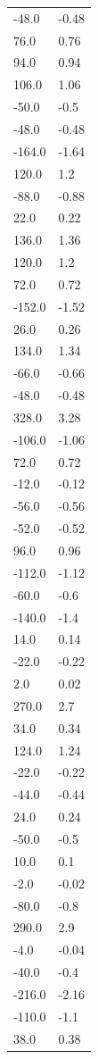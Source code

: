 \begin{longtable}{ll}
-48.0 & -0.48 \\
76.0 & 0.76 \\
94.0 & 0.94 \\
106.0 & 1.06 \\
-50.0 & -0.5 \\
-48.0 & -0.48 \\
-164.0 & -1.64 \\
120.0 & 1.2 \\
-88.0 & -0.88 \\
22.0 & 0.22 \\
136.0 & 1.36 \\
120.0 & 1.2 \\
72.0 & 0.72 \\
-152.0 & -1.52 \\
26.0 & 0.26 \\
134.0 & 1.34 \\
-66.0 & -0.66 \\
-48.0 & -0.48 \\
328.0 & 3.28 \\
-106.0 & -1.06 \\
72.0 & 0.72 \\
-12.0 & -0.12 \\
-56.0 & -0.56 \\
-52.0 & -0.52 \\
96.0 & 0.96 \\
-112.0 & -1.12 \\
-60.0 & -0.6 \\
-140.0 & -1.4 \\
14.0 & 0.14 \\
-22.0 & -0.22 \\
2.0 & 0.02 \\
270.0 & 2.7 \\
34.0 & 0.34 \\
124.0 & 1.24 \\
-22.0 & -0.22 \\
-44.0 & -0.44 \\
24.0 & 0.24 \\
-50.0 & -0.5 \\
10.0 & 0.1 \\
-2.0 & -0.02 \\
-80.0 & -0.8 \\
290.0 & 2.9 \\
-4.0 & -0.04 \\
-40.0 & -0.4 \\
-216.0 & -2.16 \\
-110.0 & -1.1 \\
38.0 & 0.38 \\

\end{longtable}
